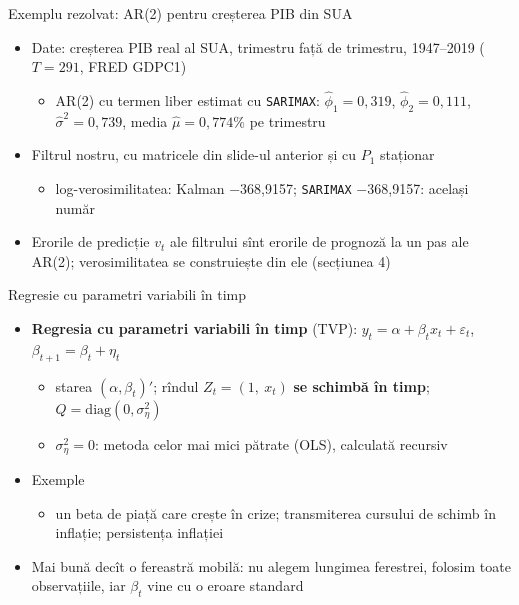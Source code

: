 \begin{frame}{Exemplu rezolvat: AR(2) pentru creșterea PIB din SUA}
\itemsize{\small}
\begin{itemize}
    \item Date: creșterea PIB real al SUA, trimestru față de trimestru, 1947--2019 ($T = 291$, FRED GDPC1)
    \begin{itemize}
        \item AR(2) cu termen liber estimat cu \texttt{SARIMAX}: $\hat\phi_1 = 0{,}319$, $\hat\phi_2 = 0{,}111$, $\hat\sigma^2 = 0{,}739$, media $\hat\mu = 0{,}774\%$ pe trimestru
    \end{itemize}
    \item Filtrul nostru, cu matricele din slide-ul anterior și cu $P_1$ staționar
    \begin{itemize}
        \item log-verosimilitatea: Kalman \ensuremath{-}368{,}9157; \texttt{SARIMAX} \ensuremath{-}368{,}9157: același număr
    \end{itemize}
    \item Erorile de predicție $v_t$ ale filtrului sînt erorile de prognoză la un pas ale AR(2); verosimilitatea se construiește din ele (secțiunea 4)
\end{itemize}
\end{frame}

\begin{frame}{Regresie cu parametri variabili în timp}
\itemsize{\small}
\begin{itemize}
    \item \textbf{Regresia cu parametri variabili în timp} (TVP): $y_t = \alpha + \beta_t x_t + \varepsilon_t$, \quad $\beta_{t+1} = \beta_t + \eta_t$
    \begin{itemize}
        \item starea $(\alpha, \beta_t)'$; rîndul $Z_t = (1,\ x_t)$ \textbf{se schimbă în timp}; $Q = \mathrm{diag}(0, \sigma^2_\eta)$
        \item $\sigma^2_\eta = 0$: metoda celor mai mici pătrate (OLS), calculată recursiv
    \end{itemize}
    \item Exemple
    \begin{itemize}
        \item un beta de piață care crește în crize; transmiterea cursului de schimb în inflație; persistența inflației
    \end{itemize}
    \item Mai bună decît o fereastră mobilă: nu alegem lungimea ferestrei, folosim toate observațiile, iar $\beta_t$ vine cu o eroare standard
\end{itemize}
\end{frame}

